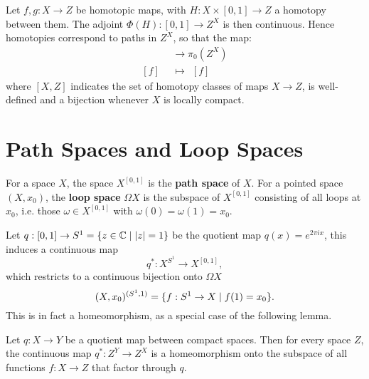 \begin{example}
Let $f,g:X\to Z$ be homotopic maps, with $H:X\times[0,1]\to Z$ a homotopy between them. The adjoint $\Phi(H):[0,1]\to Z^X$ is then continuous. Hence homotopies correspond to paths in $Z^X$, so that the map:
\begin{align*}
[X,Z]&\to\pi_0(Z^X)\\
[f]\ \ &\mapsto\ \ [f]
\end{align*}
where $[X,Z]$ indicates the set of homotopy classes of maps $X\to Z$, is well-defined and a bijection whenever $X$ is locally compact.
\end{example}

\section{Path Spaces and Loop Spaces}

For a space $X$, the space $X^{[0,1]}$ is the \textbf{path space} of $X$. For a pointed space $(X,x_0)$, the \textbf{loop space} $\Omega X$ is the subspace of $X^{[0,1]}$ consisting of all loops at $x_0$, i.e. those $\omega\in X^{[0,1]}$ with $\omega(0)=\omega(1)=x_0$.

Let $q:[0,1]\to S^1=\{z\in\mathbb{C}\mid|z|=1\}$ be the quotient map $q(x)=e^{2\pi ix}$, this induces a continuous map
\[q^*:X^{S^1}\to X^{[0,1]},\]
which restricts to a continuous bijection onto $\Omega X$
\[(X,x_0)^{(S^1,1)}=\{f:S^1\to X\mid f(1)=x_0\}.\]
This is in fact a homeomorphism, as a special case of the following lemma.

\begin{lemma**}
Let $q:X\to Y$ be a quotient map between compact spaces. Then for every space $Z$, the continuous map $q^*:Z^Y\to Z^X$ is a homeomorphism onto the subspace of all functions $f:X\to Z$ that factor through $q$.
\end{lemma**}
